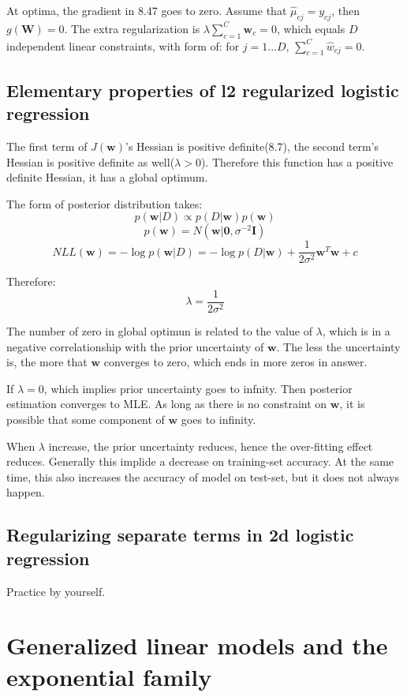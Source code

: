 \documentclass[UTF8]{ctexart}
\begin{document}
At optima, the gradient in 8.47 goes to zero. Assume that $\hat{\mu}_{cj}=y_{cj}$, then $g(\textbf{W})=0$. The extra regularization is $\lambda\sum_{c=1}^{C}\textbf{w}_{c}=0$, which equals $D$ independent linear constraints, with form of: for $j=1...D$, $\sum_{c=1}^{C}\hat{w}_{cj}=0$.

\subsection{Elementary properties of l2 regularized logistic regression}
The first term of $J(\textbf{w})$'s Hessian is positive definite(8.7), the second term's Hessian is positive definite as well($\lambda > 0$). Therefore this function has a positive definite Hessian, it has a global optimum.

The form of posterior distribution takes:
$$p(\textbf{w}|D)\propto p(D|\textbf{w})p(\textbf{w})$$
$$p(\textbf{w})=N(\textbf{w}|\textbf{0},\sigma^{-2}\textbf{I})$$
$$NLL(\textbf{w})=-\log p(\textbf{w}|D) = -\log p(D|\textbf{w}) + \frac{1}{2\sigma^{2}}\textbf{w}^{T}\textbf{w}+c$$

Therefore:
$$\lambda=\frac{1}{2\sigma^{2}}$$

The number of zero in global optimun is related to the value of $\lambda$, which is in a negative correlationship with the prior uncertainty of $\textbf{w}$. The less the uncertainty is, the more that $\textbf{w}$ converges to zero, which ends in more zeros in answer.

If $\lambda=0$, which implies prior uncertainty goes to infnity. Then posterior estimation converges to MLE. As long as there is no constraint on $\textbf{w}$, it is possible that some component of $\textbf{w}$ goes to infinity.

When $\lambda$ increase, the prior uncertainty reduces, hence the over-fitting effect reduces. Generally this implide a decrease on training-set accuracy. At the same time, this also increases the accuracy of model on test-set, but it does not always happen.

\subsection{Regularizing separate terms in 2d logistic regression}
Practice by yourself.

\newpage
\section{Generalized linear models and the exponential family}
\end{document}
